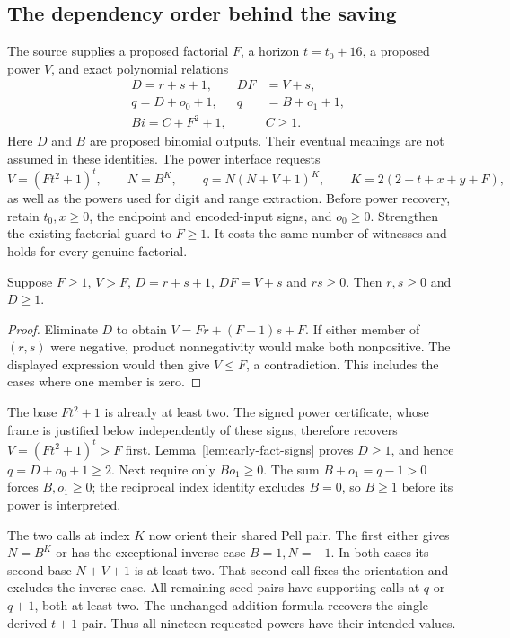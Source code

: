 \subsection{The dependency order behind the saving}

The source supplies a proposed factorial $F$, a horizon $t=t_0+16$,
a proposed power $V$, and exact polynomial relations
\begin{align}
 &D=r+s+1, & DF&=V+s,\\
 &q=D+o_0+1, &q&=B+o_1+1,\\
 &B i=C+F^2+1, &&C\ge1.
\end{align}
Here $D$ and $B$ are proposed binomial outputs.  Their eventual meanings
are not assumed in these identities.  The power interface requests
\[
 V=(Ft^2+1)^t,\qquad N=B^K,\qquad q=N(N+V+1)^K,
 \qquad K=2(2+t+x+y+F),
\]
as well as the powers used for digit and range extraction.
Before power recovery, retain $t_0,x\ge0$, the endpoint and encoded-input
signs, and $o_0\ge0$.  Strengthen the existing factorial guard to $F\ge1$.
It costs the same number of witnesses and holds for every genuine factorial.

\begin{lemma}\label{lem:early-fact-signs}
Suppose $F\ge1$, $V>F$, $D=r+s+1$, $DF=V+s$ and $rs\ge0$.
Then $r,s\ge0$ and $D\ge1$.
\end{lemma}
\begin{proof}
Eliminate $D$ to obtain $V=Fr+(F-1)s+F$.  If either member of $(r,s)$
were negative, product nonnegativity would make both nonpositive.
The displayed expression would then give $V\le F$, a contradiction.
This includes the cases where one member is zero.
\end{proof}

The base $Ft^2+1$ is already at least two.  The signed power certificate,
whose frame is justified below independently of these signs, therefore
recovers $V=(Ft^2+1)^t>F$ first.  Lemma~\ref{lem:early-fact-signs} proves
$D\ge1$, and hence $q=D+o_0+1\ge2$.  Next require only $Bo_1\ge0$.
The sum $B+o_1=q-1>0$ forces $B,o_1\ge0$; the reciprocal index identity
excludes $B=0$, so $B\ge1$ before its power is interpreted.

The two calls at index $K$ now orient their shared Pell pair.  The first
either gives $N=B^K$ or has the exceptional inverse case $B=1,N=-1$.
In both cases its second base $N+V+1$ is at least two.  That second call
fixes the orientation and excludes the inverse case.  All remaining seed
pairs have supporting calls at $q$ or $q+1$, both at least two.  The
unchanged addition formula recovers the single derived $t+1$ pair.
Thus all nineteen requested powers have their intended values.

